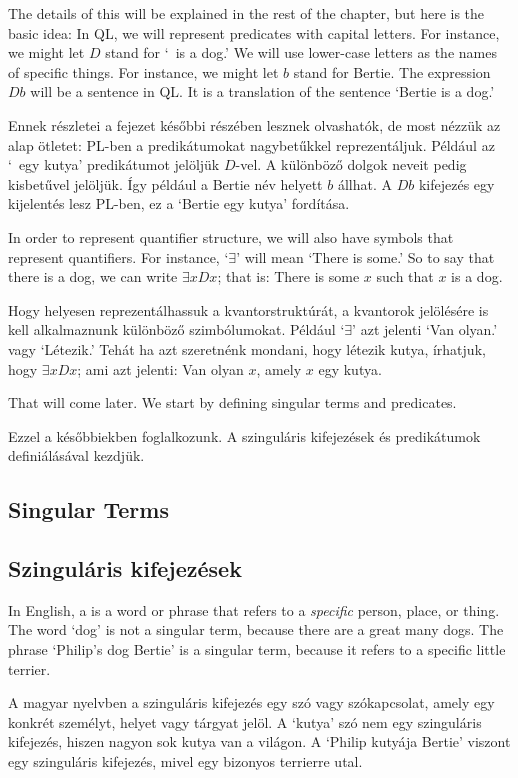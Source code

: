 The details of this will be explained in the rest of the chapter, but here is the basic idea: In QL, we will represent predicates with capital letters. For instance, we might let $D$ stand for `\blank\ is a dog.' We will use lower-case letters as the names of specific things. For instance, we might let $b$ stand for Bertie. The expression $Db$ will be a sentence in QL. It is a translation of the sentence `Bertie is a dog.'

Ennek részletei a fejezet későbbi részében lesznek olvashatók, de most nézzük az alap ötletet: PL-ben a predikátumokat nagybetűkkel reprezentáljuk. Például az `\blank\ egy kutya' predikátumot jelöljük $D$-vel. A különböző dolgok neveit pedig kisbetűvel jelöljük. Így például a Bertie név helyett $b$ állhat. A $Db$ kifejezés egy kijelentés lesz PL-ben, ez a `Bertie egy kutya' fordítása.

In order to represent quantifier structure, we will also have symbols that represent quantifiers. For instance, `$\exists$' will mean `There is some\blank.' So to say that there is a dog, we can write $\exists x Dx$; that is: There is some $x$ such that $x$ is a dog.

Hogy helyesen reprezentálhassuk a kvantorstruktúrát, a kvantorok jelölésére is kell alkalmaznunk különböző szimbólumokat. Például `$\exists$' azt jelenti `Van olyan\blank.' vagy `Létezik\blank.' Tehát ha azt szeretnénk mondani, hogy létezik kutya, írhatjuk, hogy $\exists x Dx$; ami azt jelenti: Van olyan $x$, amely $x$ egy kutya.

That will come later. We start by defining singular terms and predicates.

Ezzel a későbbiekben foglalkozunk. A szinguláris kifejezések és predikátumok definiálásával kezdjük.

\subsection*{Singular Terms}
\subsection{Szinguláris kifejezések}

In English, a  is a word or phrase that refers to a \emph{specific} person, place, or thing. The word `dog' is not a singular term, because there are a great many dogs. The phrase `Philip's dog Bertie' is a singular term, because it refers to a specific little terrier.

A magyar nyelvben a szinguláris kifejezés egy szó vagy szókapcsolat, amely egy konkrét személyt, helyet vagy tárgyat jelöl. A `kutya' szó nem egy szinguláris kifejezés, hiszen nagyon sok kutya van a világon. A `Philip kutyája Bertie' viszont egy szinguláris kifejezés, mivel egy bizonyos terrierre utal.

